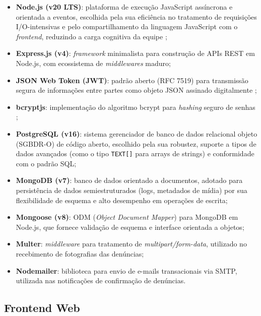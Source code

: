 \documentclass[12pt, a4paper]{article}
\numberwithin{equation}{section}
\numberwithin{figure}{section}
\numberwithin{table}{section}
\begin{document}
\begin{itemize}
  \item \textbf{Node.js (v20 LTS)}: plataforma de execução JavaScript
        assíncrona e orientada a eventos, escolhida pela sua eficiência no
        tratamento de requisições I/O-intensivas e pelo compartilhamento da
        linguagem JavaScript com o \textit{frontend}, reduzindo a carga
        cognitiva da equipe \cite{tilkov2010};
  \item \textbf{Express.js (v4)}: \textit{framework} minimalista para
        construção de APIs REST em Node.js, com ecossistema de
        \textit{middlewares} maduro;
  \item \textbf{JSON Web Token (JWT)}: padrão aberto (RFC 7519) para
        transmissão segura de informações entre partes como objeto JSON
        assinado digitalmente \cite{jones2015};
  \item \textbf{bcryptjs}: implementação do algoritmo bcrypt para
        \textit{hashing} seguro de senhas \cite{provos1999};
  \item \textbf{PostgreSQL (v16)}: sistema gerenciador de banco de dados
        relacional objeto (SGBDR-O) de código aberto, escolhido pela sua
        robustez, suporte a tipos de dados avançados (como o tipo
        \texttt{TEXT[]} para arrays de strings) e conformidade com o
        padrão SQL;
  \item \textbf{MongoDB (v7)}: banco de dados orientado a documentos,
        adotado para persistência de dados semiestruturados (logs, metadados
        de mídia) por sua flexibilidade de esquema e alto desempenho em
        operações de escrita;
  \item \textbf{Mongoose (v8)}: ODM (\textit{Object Document Mapper}) para
        MongoDB em Node.js, que fornece validação de esquema e interface
        orientada a objetos;
  \item \textbf{Multer}: \textit{middleware} para tratamento de
        \textit{multipart/form-data}, utilizado no recebimento de fotografias
        das denúncias;
  \item \textbf{Nodemailer}: biblioteca para envio de e-mails transacionais
        via SMTP, utilizada nas notificações de confirmação de denúncias.
\end{itemize}

\subsection{Frontend Web}
\end{document}
